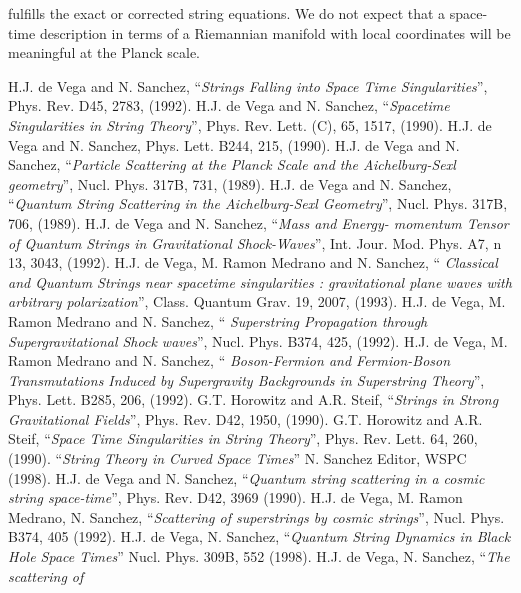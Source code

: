 \documentclass[12pt,a4paper]{article}
\begin{document}
fulfills the exact or corrected string equations. We do not expect that a 
space-time description in terms of a Riemannian manifold with local 
coordinates \coordHE{} will be meaningful at the Planck scale.    
\begin{thebibliography}{10}
 H.J. de Vega and N. Sanchez, ``{\it Strings Falling 
into Space Time Singularities}'', Phys. Rev. D45, 2783, (1992). 
 H.J. de Vega and N. Sanchez, ``{\it Spacetime 
Singularities in String Theory}'', Phys. Rev. Lett. (C), 65, 1517, (1990). 
 H.J. de Vega and N. Sanchez, Phys. Lett. B244, 215, (1990). 
 H.J. de Vega and N. Sanchez, ``{\it Particle Scattering 
at the Planck Scale and the Aichelburg-Sexl geometry}'', Nucl. Phys. 317B, 
731, (1989).
 H.J. de Vega and N. Sanchez, ``{\it Quantum String 
Scattering in the Aichelburg-Sexl Geometry}'', Nucl. Phys. 317B, 706, (1989). 
 H.J. de Vega and N. Sanchez, ``{\it Mass and Energy-
momentum Tensor of Quantum Strings in Gravitational Shock-Waves}'', Int. 
Jour. Mod. Phys. A7, n\coordHE{} 13, 3043, (1992). 
 H.J. de Vega, M. Ramon Medrano and N. Sanchez, ``{\it 
Classical and Quantum Strings near spacetime singularities : gravitational 
plane waves with arbitrary polarization}'', Class. Quantum Grav. 19, 2007, 
(1993). 
 H.J. de Vega, M. Ramon Medrano and N. Sanchez, ``{\it 
Superstring Propagation through Supergravitational Shock waves}'', Nucl. 
Phys. B374, 425, (1992). 
 H.J. de Vega, M. Ramon Medrano and N. Sanchez, ``{\it 
Boson-Fermion and Fermion-Boson Transmutations Induced by Supergravity 
Backgrounds in Superstring Theory}'', Phys. Lett. B285, 206, (1992). 
 G.T. Horowitz and A.R. Steif, ``{\it Strings in Strong 
Gravitational Fields}'', Phys. Rev. D42, 1950, (1990).  
 G.T. Horowitz and A.R. Steif, ``{\it Space Time Singularities in String Theory}'', Phys. Rev. Lett. 64, 260, (1990).
 ``{\it String  Theory in Curved Space Times}'' 
N. Sanchez Editor, WSPC (1998).
 H.J. de Vega and N. Sanchez, ``{\it Quantum string 
scattering in a cosmic string space-time}'', Phys. Rev. D42, 3969 (1990).
 H.J. de Vega, M. Ramon Medrano, N. Sanchez, ``{\it Scattering 
of superstrings by cosmic strings}'', Nucl. Phys. B374, 405 (1992). 
 H.J. de Vega, N. Sanchez, ``{\it Quantum String Dynamics 
in Black Hole Space Times}''  Nucl. Phys. 309B, 552 (1998).
 H.J. de Vega, N. Sanchez, ``{\it The scattering of 
}
\end{thebibliography}
\end{document}
